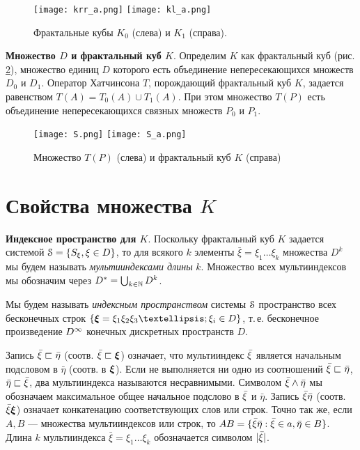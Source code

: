 \begin{figure}[h!]
\centering
\qquad
\texttt{[image: krr\_a.png]}
\hfill
\texttt{[image: kl\_a.png]}
\qquad
\caption{Фрактальные кубы $K_0$ (слева) и $K_1$ (справа).}
\label{fig:5_2}
\end{figure}

{\bf Множество $ D$ и фрактальный куб $K$}.  
Определим $K$ как фрактальный куб (рис. \ref{fig:5_3}), множество единиц $D$ которого есть объединение непересекающихся множеств $D_0$  и  $D_1$. 
Оператор Хатчинсона $T$, порождающий фрактальный куб $K$, задается равенством $T(A)=T_0(A)\cup T_1(A)$. 
При этом множество $T(P)$ есть объединение непересекающихся связных множеств $P_0$  и $P_1$.

\begin{figure}[H]
\centering
\qquad
\texttt{[image: S.png]}
\hfill
\texttt{[image: S\_a.png]}
\qquad
\caption{Множество $T(P)$ (слева) и фрактальный куб $K$ (справа)}
\label{fig:5_3}
\end{figure}



\section{Свойства множества $K$}

{\bf Индексное пространство для $K$}.
Поскольку фрактальный куб $K$ задается системой ${\EuScript S}=\{S_\xi, \xi\in D\}$, то
для всякого $k$ элементы $\bar\xi=\xi_1\ldots\xi_k$ множества $ D^k$ мы будем называть {\it мультииндексами длины} $k$.
Множество всех мультииндексов мы обозначим через $ D^*=\bigcup_{k\in\mathbb{N}} D^k$.

Мы будем называть {\em индексным пространством} системы ${\EuScript S}$  пространство всех бесконечных строк  $\{\bmx=\xi_1\xi_2\xi_3…;\xi_i\in  D\}$, т.\,е. бесконечное произведение $D^\infty$ конечных дискретных пространств $D$.

Запись ${\bar{\xi}}\sqsubset \bar\eta$ (соотв. ${\bar{\xi}}\sqsubset {\bm{\xi}}$) означает, что мультииндекс ${\bar{\xi}}$ является начальным подсловом в $\bar\eta$ (соотв. в ${\bm{\xi}}$).
Если не выполняется ни одно из соотношений ${\bar{\xi}}\sqsubset \bar\eta$, $ \bar\eta\sqsubset{\bar{\xi}}$, два мультииндекса называются несравнимыми. 
Символом ${\bar{\xi}}\wedge \bar\eta$ мы обозначаем максимальное общее начальное подслово в ${\bar{\xi}}$  и  $\bar\eta$. 
Запись ${\bar{\xi}}\bar\eta$ (соотв. ${\bar{\xi}}{\bm{\xi}}$) означает конкатенацию соответствующих слов или строк. 
Точно так же, если $A,B$ --- множества мультииндексов или строк, то $AB=\{{\bar{\xi}}\bar\eta: {\bar{\xi}}\in a,\bar\eta\in B\}$.   
Длина $k$ мультииндекса $\bar\xi=\xi_1\ldots\xi_k$ обозначается символом $|{\bar{\xi}}|$.

